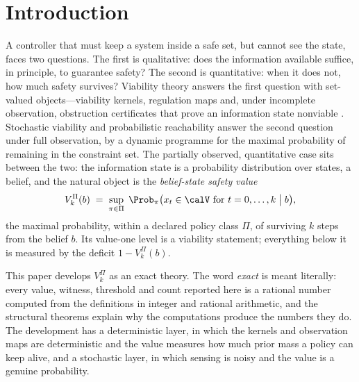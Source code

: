 \section{Introduction}\label{sec:intro}

A controller that must keep a system inside a safe set, but cannot see the state, faces two questions. The first is qualitative: does the information available suffice, in principle, to guarantee safety? The second is quantitative: when it does not, how much safety survives? Viability theory answers the first question with set-valued objects---viability kernels, regulation maps and, under incomplete observation, obstruction certificates that prove an information state nonviable \cite{Aubin1991,Veliov1993,Doyen2000,Abaee2026calc}. Stochastic viability \cite{DeLaraDoyen2008,DoyenDeLara2010} and probabilistic reachability \cite{Abate2008} answer the second question under full observation, by a dynamic programme for the maximal probability of remaining in the constraint set. The partially observed, quantitative case sits between the two: the information state is a probability distribution over states, a belief, and the natural object is the \emph{belief-state safety value}
\[
V^{\Pi}_{k}(b)\;=\;\sup_{\pi\in\Pi}\;\Prob_{\pi}\bigl(x_t\in\calV\ \text{for } t=0,\dots,k\;\big|\;b\bigr),
\]
the maximal probability, within a declared policy class $\Pi$, of surviving $k$ steps from the belief $b$. Its value-one level is a viability statement; everything below it is measured by the deficit $1-V^{\Pi}_k(b)$.

This paper develops $V^{\Pi}_k$ as an exact theory. The word \emph{exact} is meant literally: every value, witness, threshold and count reported here is a rational number computed from the definitions in integer and rational arithmetic, and the structural theorems explain why the computations produce the numbers they do. The development has a deterministic layer, in which the kernels and observation maps are deterministic and the value measures how much prior mass a policy can keep alive, and a stochastic layer, in which sensing is noisy and the value is a genuine probability.

